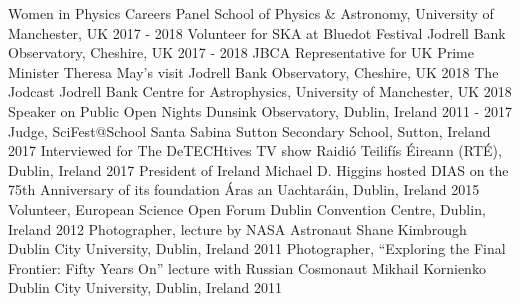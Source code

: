 \begin{cvpress}
   \cvpres
   {Women in Physics Careers Panel}
    {School of Physics \& Astronomy, University of Manchester, UK}
    {2017 - 2018}
   \cvpres
   {Volunteer for SKA at Bluedot Festival}
    {Jodrell Bank Observatory, Cheshire, UK}
    {2017 - 2018}
   \cvpres
   {JBCA Representative for UK Prime Minister Theresa May's visit}
    {Jodrell Bank Observatory, Cheshire, UK}
    {2018}
   \cvpres
   {The Jodcast}
    {Jodrell Bank Centre for Astrophysics, University of Manchester, UK}
    {2018}
   \cvpres
   {Speaker on Public Open Nights}
    {Dunsink Observatory, Dublin, Ireland}
    {2011 - 2017}
   \cvpres
   {Judge, SciFest@School}
    {Santa Sabina Sutton Secondary School, Sutton, Ireland}
    {2017}
   \cvpres
   {Interviewed for The DeTECHtives TV show}
    {Raidi{\'o} Teilif{\'i}s {\'E}ireann (RT{\'E}), Dublin, Ireland}
    {2017}
   \cvpres
   {President of Ireland Michael D. Higgins hosted DIAS on the 75th Anniversary of its foundation}
    {{\'A}ras an Uachtar{\'a}in, Dublin, Ireland}
    {2015}
   \cvpres
   {Volunteer, European Science Open Forum}
    {Dublin Convention Centre, Dublin, Ireland}
    {2012}
   \cvpres
   {Photographer, lecture by NASA Astronaut Shane Kimbrough}
    {Dublin City University, Dublin, Ireland}
    {2011}
   \cvpres
   {Photographer, ``Exploring the Final Frontier: Fifty Years On'' lecture with Russian Cosmonaut Mikhail Kornienko}
    {Dublin City University, Dublin, Ireland}
    {2011}
\end{cvpress}


